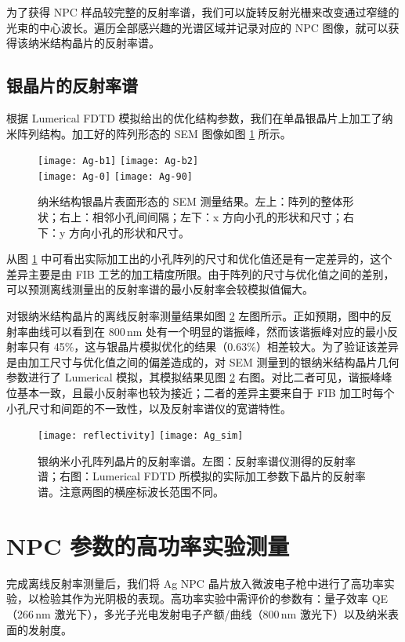 为了获得 NPC 样品较完整的反射率谱，我们可以旋转反射光栅来改变通过窄缝的光束的中心波长。遍历全部感兴趣的光谱区域并记录对应的 NPC 图像，就可以获得该纳米结构晶片的反射率谱。

\subsection{银晶片的反射率谱}
根据 Lumerical FDTD 模拟给出的优化结构参数，我们在单晶银晶片上加工了纳米阵列结构。加工好的阵列形态的 SEM 图像如图 \ref{fig:Ag_b_sem} 所示。
\begin{figure}[htbp]
\begin{center}
\texttt{[image: Ag-b1]}
\texttt{[image: Ag-b2]}
\\[2pt]
\texttt{[image: Ag-0]}
\texttt{[image: Ag-90]}
\caption{\label{fig:Ag_b_sem} 
纳米结构银晶片表面形态的 SEM 测量结果。左上：阵列的整体形状；右上：相邻小孔间间隔；左下：x 方向小孔的形状和尺寸；右下：y 方向小孔的形状和尺寸。}
\end{center}
\end{figure}
从图 \ref{fig:Ag_b_sem} 中可看出实际加工出的小孔阵列的尺寸和优化值还是有一定差异的，这个差异主要是由 FIB 工艺的加工精度所限。由于阵列的尺寸与优化值之间的差别，可以预测离线测量出的反射率谱的最小反射率会较模拟值偏大。

对银纳米结构晶片的离线反射率测量结果如图 \ref{fig:Ag-b} 左图所示。正如预期，图中的反射率曲线可以看到在 800\,nm 处有一个明显的谐振峰，然而该谐振峰对应的最小反射率只有 45\%，这与银晶片模拟优化的结果（0.63\%）相差较大。为了验证该差异是由加工尺寸与优化值之间的偏差造成的，对 SEM 测量到的银纳米结构晶片几何参数进行了 Lumerical 模拟，其模拟结果见图 \ref{fig:Ag-b} 右图。对比二者可见，谐振峰峰位基本一致，且最小反射率也较为接近；二者的差异主要来自于 FIB 加工时每个小孔尺寸和间距的不一致性，以及反射率谱仪的宽谱特性。
\begin{figure}[htbp]
\begin{center}
\texttt{[image: reflectivity]}
\texttt{[image: Ag\_sim]}
\caption{\label{fig:Ag-b}
银纳米小孔阵列晶片的反射率谱。左图：反射率谱仪测得的反射率谱；右图：Lumerical FDTD 所模拟的实际加工参数下晶片的反射率谱。注意两图的横座标波长范围不同。}
\end{center}
\end{figure}

\section{NPC 参数的高功率实验测量}
完成离线反射率测量后，我们将 Ag NPC 晶片放入微波电子枪中进行了高功率实验，以检验其作为光阴极的表现。高功率实验中需评价的参数有：量子效率 QE（266\,nm 激光下），多光子光电发射电子产额/曲线（800\,nm 激光下）以及纳米表面的发射度。

